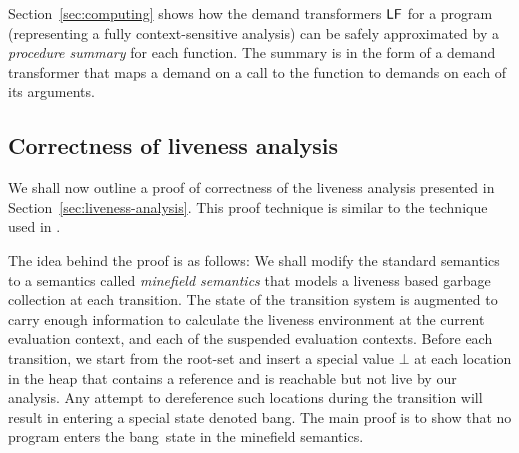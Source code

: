\documentclass[9pt]{sigplanconf}
\newcommand{\bang}{\mbox{\sc bang}}
\begin{document}
Section~\ref{sec:computing}   shows   how  the   demand   transformers
$\mathsf{LF}$  for  a  program  (representing  a  fully  context-sensitive
analysis) can be safely approximated  by a {\em procedure summary} for
each function.   The summary is  in the  form of a  demand transformer
that maps a demand on a call to the function to demands on each of its
arguments.

\subsection{Correctness of liveness analysis}  

We shall now  outline a proof of correctness of  the liveness analysis
presented   in    Section~\ref{sec:liveness-analysis}.    This   proof
technique  is  similar to  the  technique  used in  \cite{asati14lgc}.

The idea behind the proof is  as follows: We shall modify the standard
semantics to a semantics  called {\em minefield semantics} that models
a liveness based garbage collection  at each transition.  The state of
the  transition system  is augmented  to carry  enough  information to
calculate the liveness environment  at the current evaluation context,
and  each   of  the   suspended  evaluation  contexts.    Before  each
transition,  we start  from the  root-set and  insert a  special value
$\bot$ at each  location in the heap that contains  a reference and is
reachable but  not live by  our analysis.  Any attempt  to dereference
such locations during the transition will result in entering a special
state denoted \bang.  The main proof is to show that no program enters
the \bang\ state in the minefield semantics.
 

\newcommand{\cred}[1]{\psframebox[linestyle=none,
    fillcolor=lightgray,fillstyle=solid,framesep=0.2pt]{#1}}
\end{document}
